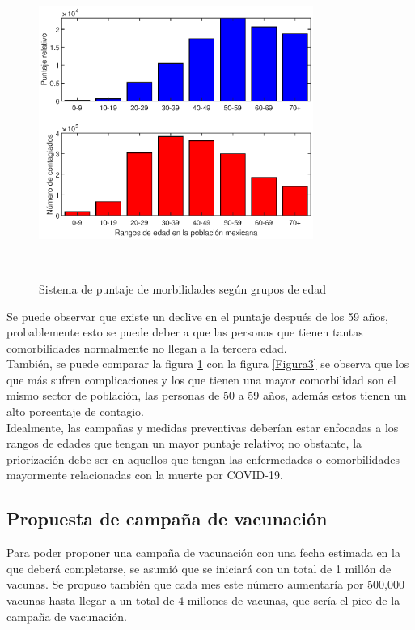 \documentclass[12pt,a4paper]{article}
\begin{document}
\begin{figure}
\centering
\includegraphics[width = 0.8\textwidth]{Figura4.eps}
\caption{Sistema de puntaje de morbilidades según grupos de edad}  \\
\label{Figura4}
\end{figure}
Se puede observar que existe un declive en el puntaje después de los 59 años, probablemente esto se puede deber a que las personas que tienen tantas comorbilidades normalmente no llegan a la tercera edad.\\
También, se puede comparar la figura \ref{Figura4} con la figura \ref{Figura3} se observa que los que más sufren complicaciones y los que tienen una mayor comorbilidad son el mismo sector de población, las personas de 50 a 59 años, además estos tienen un alto porcentaje de contagio. \\


Idealmente, las campañas y medidas preventivas deberían estar enfocadas a los rangos de edades que tengan un mayor puntaje relativo; no obstante, la priorización debe ser en aquellos que tengan las enfermedades o comorbilidades mayormente relacionadas con la muerte por COVID-19.  
\setlength{\parindent}{1cm}
\subsection{Propuesta de campaña de vacunación}
\setlength{\parindent}{0cm}
Para poder proponer una campaña de vacunación con una fecha estimada en la que deberá completarse, se asumió que se iniciará con un total de 1 millón de vacunas. Se propuso también que cada mes este número aumentaría por 500,000 vacunas hasta llegar a un total de 4 millones de vacunas, que sería el pico de la campaña de vacunación.
\end{document}
